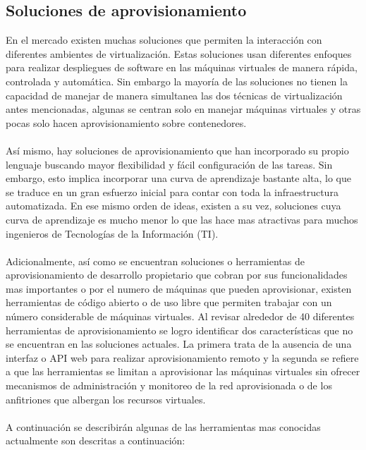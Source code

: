 \documentclass[conference, spanish]{IEEEtran}
\begin{document}
\subsection{Soluciones de aprovisionamiento}
En el mercado existen muchas soluciones que permiten la interacción con diferentes ambientes de virtualización. Estas soluciones usan diferentes enfoques para realizar despliegues de software en las máquinas virtuales de manera rápida, controlada y automática. Sin embargo la mayoría de las soluciones no tienen la capacidad de manejar de manera simultanea las dos técnicas de virtualización antes mencionadas, algunas se centran solo en manejar máquinas virtuales y otras pocas solo hacen aprovisionamiento sobre contenedores.\\
\\
Así mismo, hay soluciones de aprovisionamiento que han incorporado su propio lenguaje buscando mayor flexibilidad y fácil configuración de las tareas. Sin embargo, esto implica incorporar una curva de aprendizaje bastante alta, lo que se traduce en un gran esfuerzo inicial para contar con toda la infraestructura automatizada. En ese mismo orden de ideas, existen a su vez, soluciones cuya curva de aprendizaje es mucho menor lo que las hace mas atractivas para muchos ingenieros de Tecnologías de la Información (TI).\\
\\
Adicionalmente, así como se encuentran soluciones o herramientas de aprovisionamiento de desarrollo propietario que cobran por sus funcionalidades mas importantes o por el numero de máquinas que pueden aprovisionar, existen herramientas de código abierto o de uso libre que permiten trabajar con un número considerable de máquinas virtuales. Al revisar alrededor de 40 diferentes herramientas de aprovisionamiento se logro identificar dos características que no se encuentran en las soluciones actuales. La primera trata de la ausencia de una interfaz o API web para realizar aprovisionamiento remoto y la segunda se refiere a que las herramientas se limitan a aprovisionar las máquinas virtuales sin ofrecer mecanismos de administración y monitoreo de la red aprovisionada o de los anfitriones que albergan los recursos virtuales.\\
\\
A continuación se describirán algunas de las herramientas mas conocidas actualmente son descritas a continuación:
\end{document}
